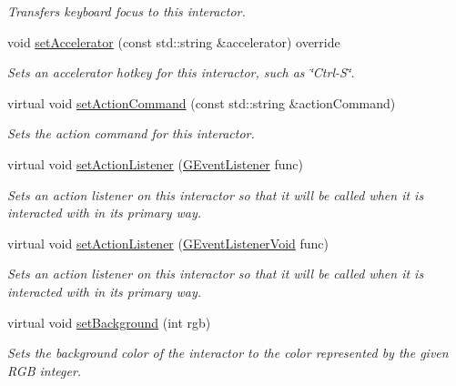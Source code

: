 \begin{DoxyCompactItemize}
\begin{DoxyCompactList}\small\item\em Transfers keyboard focus to this interactor. \end{DoxyCompactList}\item 
void \mbox{\hyperlink{classsgl_1_1GButton_a502f311e78e7531f8a7b50054ce91c85}{set\+Accelerator}} (const std\+::string \&accelerator) override
\begin{DoxyCompactList}\small\item\em Sets an accelerator hotkey for this interactor, such as \char`\"{}\+Ctrl-\/\+S\char`\"{}. \end{DoxyCompactList}\item 
virtual void \mbox{\hyperlink{classsgl_1_1GInteractor_a4b5843fe3030e038a1ba54cc03389bcf}{set\+Action\+Command}} (const std\+::string \&action\+Command)
\begin{DoxyCompactList}\small\item\em Sets the action command for this interactor. \end{DoxyCompactList}\item 
virtual void \mbox{\hyperlink{classsgl_1_1GInteractor_adcfb4742430c88714fcf57e57ab8ea9c}{set\+Action\+Listener}} (\mbox{\hyperlink{namespacesgl_ae9f3e9eab70035da1a2b114e21357b25}{G\+Event\+Listener}} func)
\begin{DoxyCompactList}\small\item\em Sets an action listener on this interactor so that it will be called when it is interacted with in its primary way. \end{DoxyCompactList}\item 
virtual void \mbox{\hyperlink{classsgl_1_1GInteractor_aebd20a89c7a8a43a6fce999cf4f9fcf2}{set\+Action\+Listener}} (\mbox{\hyperlink{namespacesgl_a54427ce97bb1c2804e4fe2b0a62e8b17}{G\+Event\+Listener\+Void}} func)
\begin{DoxyCompactList}\small\item\em Sets an action listener on this interactor so that it will be called when it is interacted with in its primary way. \end{DoxyCompactList}\item 
virtual void \mbox{\hyperlink{classsgl_1_1GInteractor_acba7e546c2025c0a15ca4b4cc92043db}{set\+Background}} (int rgb)
\begin{DoxyCompactList}\small\item\em Sets the background color of the interactor to the color represented by the given R\+GB integer. \end{DoxyCompactList}\item 

\end{DoxyCompactItemize}
